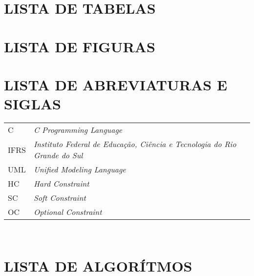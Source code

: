 \documentclass[12pt,a4paper]{article}
\begin{document}
	\section*{LISTA DE TABELAS}

	\listoftables

	\newpage

	\thispagestyle{empty}
	\section*{LISTA DE FIGURAS}

	\listoffigures

	\newpage


	\thispagestyle{empty}
	\section*{LISTA DE ABREVIATURAS E SIGLAS}

	\begin{tabular}{p{3cm} p{}}
	  C & \textit{C Programming Language} \\
	  IFRS & \textit{Instituto Federal de Educação, Ciência e Tecnologia do Rio Grande do Sul} \\
	  UML & \textit{Unified Modeling Language} \\
	  HC & \textit{Hard Constraint} \\
	  SC & \textit{Soft Constraint} \\
	  OC & \textit{Optional Constraint}
	\end{tabular}\\


	\newpage


	\thispagestyle{empty}
	\section*{LISTA DE ALGORÍTMOS}


	\newpage



	\thispagestyle{empty}
\end{document}
